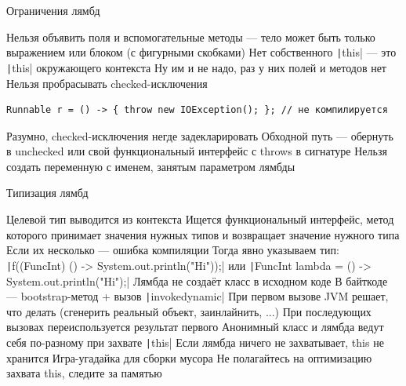 \documentclass{../../slides-style}
\begin{document}
    \begin{frame}[fragile]{Ограничения лямбд}
        \begin{outline}
            \1 Нельзя объявить поля и вспомогательные методы --- тело может быть только выражением или блоком (с фигурными скобками)
            \1 Нет собственного \texttt|this| --- это \texttt|this| окружающего контекста
                \2 Ну им и не надо, раз у них полей и методов нет
            \1 Нельзя пробрасывать checked-исключения
                \begin{footnotesize}
                    \begin{verbatim}
Runnable r = () -> { throw new IOException(); }; // не компилируется
                    \end{verbatim}
                \end{footnotesize}
                \2 Разумно, checked-исключения негде задекларировать
                \2 Обходной путь --- обернуть в unchecked или свой функциональный интерфейс с throws в сигнатуре
            \1 Нельзя создать переменную с именем, занятым параметром лямбды
        \end{outline}
    \end{frame}

    \begin{frame}{Типизация лямбд}
        \begin{outline}
            \1 Целевой тип выводится из контекста
                \2 Ищется функциональный интерфейс, метод которого принимает значения нужных типов и возвращает значение нужного типа
                \2 Если их несколько --- ошибка компиляции
                    \3 Тогда явно указываем тип: \texttt|f((FuncInt) () -> System.out.println("Hi"));| или \texttt|FuncInt lambda = () -> System.out.println("Hi");|
            \1 Лямбда не создаёт класс в исходном коде
                \2 В байткоде --- bootstrap-метод + вызов \texttt|invokedynamic|
                \2 При первом вызове JVM решает, что делать (сгенерить реальный объект, заинлайнить, ...)
                \2 При последующих вызовах переиспользуется результат первого
            \1 Анонимный класс и лямбда ведут себя по-разному при захвате \texttt|this|
                \2 Если лямбда ничего не захватывает, this не хранится
                \2 Игра-угадайка для сборки мусора
                    \3 Не полагайтесь на оптимизацию захвата this, следите за памятью
        \end{outline}
    \end{frame}
\end{document}
